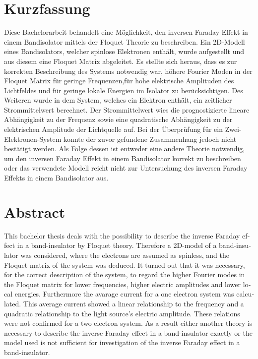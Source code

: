 \thispagestyle{plain}

\section*{Kurzfassung}
Diese Bachelorarbeit behandelt eine Möglichkeit,
den inversen Faraday Effekt
in einem Bandisolator
mittels der Floquet Theorie zu beschreiben.
Ein 2D-Modell eines Bandisolators,
welcher spinlose Elektronen enthält,
wurde aufgestellt und aus diesem
eine Floquet Matrix abgeleitet.
Es stellte sich heraus, dass es zur
korrekten Beschreibung des Systems
notwendig war, höhere Fourier Moden
in der Floquet Matrix
für geringe Frequenzen,für hohe
elektrische Amplituden des Lichtfeldes
und für geringe lokale Energien
im Isolator
 zu berücksichtigen.
Des Weiteren wurde in dem System, welches
ein Elektron enthält, ein zeitlicher Strommittelwert
berechnet. Der Strommittelwert wies
die prognostizierte
lineare Abhängigkeit
zu der Frequenz sowie eine quadratische Abhängigkeit
zu der elektrischen Amplitude der Lichtquelle auf.
Bei der Überprüfung für ein Zwei-Elektronen-System
konnte der zuvor gefundene Zusammenhang
jedoch nicht bestätigt werden.
Als Folge dessen
ist entweder eine andere Theorie notwendig,
um den inversen Faraday Effekt
in einem Bandisolator korrekt zu beschreiben
oder das verwendete Modell reicht nicht zur Untersuchung
des inversen Faraday Effekts in einem
 Bandisolator aus.

\section*{Abstract}
\begin{english}
This bachelor thesis deals with
 the possibility to describe
the inverse Faraday effect
in a band-insulator by Floquet theory.
Therefore a 2D-model of a band-insulator was considered,
where the electrons are assumed as spinless,
and the Floquet matrix of the system
was deduced.
It turned out that it was necessary, for the
correct description of the system, to regard the
higher Fourier modes in the Floquet
matrix for lower frequencies, higher
electric amplitudes
and lower local energies. Furthermore the
avarage current for a one electron system was calculated.
This average current showed a linear relationship to the
frequency and a quadratic relationship
to the light source's electric amplitude.
These relations were not
confirmed for a two
electron system.
As a result either another theory
is necessary to describe
the inverse Faraday effect
in a band-insulator exactly or the model used
is not sufficient for investigation
of the inverse Faraday effect in a band-insulator.
\end{english}
